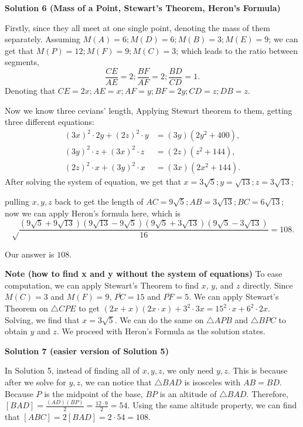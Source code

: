 \begin{enumerate}
 



\textbf{Solution 6 (Mass of a Point, Stewart's Theorem, Heron's Formula)}

Firstly, since they all meet at one single point, denoting the mass of them separately. Assuming $M(A)=6;M(D)=6;M(B)=3;M(E)=9$; we can get that $M(P)=12;M(F)=9;M(C)=3$; which leads to the ratio between segments, 
 \[\frac{CE}{AE}=2;\frac{BF}{AF}=2;\frac{BD}{CD}=1.\] Denoting that $CE=2x;AE=x; AF=y; BF=2y; CD=z; DB=z.$ 

 Now we know three cevians' length, Applying Stewart theorem to them, getting three different equations:
 \begin{align} (3x)^2 \cdot 2y+(2z)^2 \cdot y&=(3y)(2y^2+400), \\ (3y)^2 \cdot z+(3x)^2 \cdot z&=(2z)(z^2+144), \\ (2z)^2 \cdot x+(3y)^2 \cdot x&=(3x)(2x^2+144). \end{align}After solving the system of equation, we get that $x=3\sqrt{5};y=\sqrt{13};z=3\sqrt{13}$;

 pulling $x,y,z$ back to get the length of $AC=9\sqrt{5};AB=3\sqrt{13};BC=6\sqrt{13}$; now we can apply Heron's formula here, which is 
 \[\sqrt\frac{(9\sqrt{5}+9\sqrt{13})(9\sqrt{13}-9\sqrt{5})(9\sqrt{5}+3\sqrt{13})(9\sqrt{5}-3\sqrt{13})}{16}=108.\]

 Our answer is $\boxed{108}$.

 \textbf{Note (how to find x and y without the system of equations)} To ease computation, we can apply Stewart's Theorem to find $x$, $y$, and $z$ directly. Since $M(C)=3$ and $M(F)=9$, $\overline{PC}=15$ and $\overline{PF}=5$. We can apply Stewart's Theorem on $\triangle CPE$ to get $(2x+x)(2x \cdot x) + 3^2 \cdot 3x = 15^2 \cdot x + 6^2\cdot 2x$. Solving, we find that $x=3\sqrt{5}$. We can do the same on $\triangle APB$ and $\triangle BPC$ to obtain $y$ and $z$. We proceed with Heron's Formula as the solution states. 

 



\textbf{Solution 7 (easier version of Solution 5)}

In Solution 5, instead of finding all of $x, y, z$, we only need $y, z$. This is because after we solve for $y, z$, we can notice that $\triangle BAD$ is isosceles with $AB = BD$. Because $P$ is the midpoint of the base, $BP$ is an altitude of $\triangle BAD$. Therefore, $[BAD] = \frac{(AD)(BP)}{2} = \frac{12 \cdot 9}{2} = 54$. Using the same altitude property, we can find that $[ABC] = 2[BAD] = 2 \cdot 54 = \boxed{108}$.


\end{enumerate}
